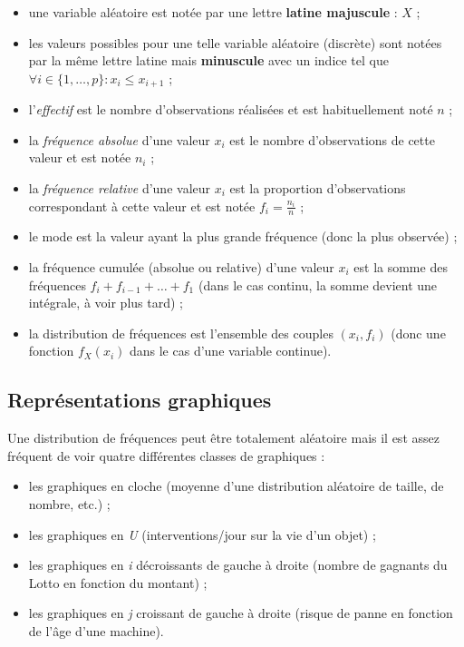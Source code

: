 \documentclass{article}
\begin{document}
		\begin{itemize}
			\item une variable aléatoire est notée par une lettre \textbf{latine majuscule} : $X$ ;
			\item les valeurs possibles pour une telle variable aléatoire (discrète) sont notées par la même lettre latine mais \textbf{minuscule} avec un indice tel que
				  $\forall i \in \{1, \ldots, p\} : x_i \leq x_{i+1}$ ;
			\item l'\textit{effectif} est le nombre d'observations réalisées et est habituellement noté $n$ ;
			\item la \textit{fréquence absolue} d'une valeur $x_i$ est le nombre d'observations de cette valeur et est notée $n_i$ ;
			\item la \textit{fréquence relative} d'une valeur $x_i$ est la proportion d'observations correspondant à cette valeur et est notée $f_i = \frac {n_i}n$ ;
			\item le mode est la valeur ayant la plus grande fréquence (donc la plus observée) ;
			\item la fréquence cumulée (absolue ou relative) d'une valeur $x_i$ est la somme des fréquences $f_i + f_{i-1} + \ldots + f_1$ (dans le cas continu, la somme
				  devient une intégrale, à voir plus tard) ;
			\item la distribution de fréquences est l'ensemble des couples $(x_i, f_i)$ (donc une fonction $f_X(x_i)$ dans le cas d'une variable continue).
		\end{itemize} 

	\subsection{Représentations graphiques}
		Une distribution de fréquences peut être totalement aléatoire mais il est assez fréquent de voir quatre différentes classes de graphiques :

		\begin{itemize}
			\item les graphiques en cloche (moyenne d'une distribution aléatoire de taille, de nombre, etc.) ;
			\item les graphiques en \textit{U} (interventions/jour sur la vie d'un objet) ;
			\item les graphiques en \textit{i} décroissants de gauche à droite (nombre de gagnants du Lotto en fonction du montant) ;
			\item les graphiques en \textit{j} croissant de gauche à droite (risque de panne en fonction de l'âge d'une machine).
		\end{itemize}
	
\end{document}
